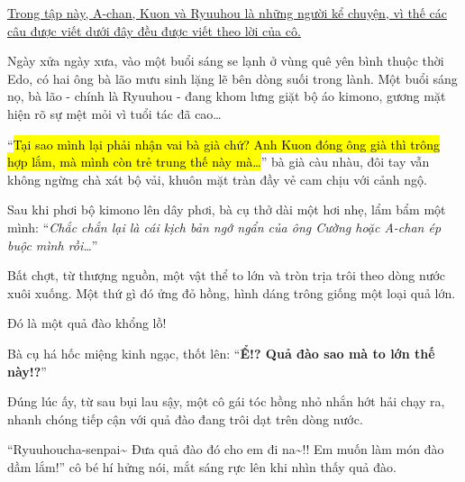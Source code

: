 \documentclass[../main.tex]{subfiles}
\begin{document}


\begin{center}
    \uline{Trong tập này, A-chan, Kuon và Ryuuhou là những người kể chuyện, vì thế các câu được viết dưới đây đều được viết theo lời của cô.}
\end{center}

Ngày xửa ngày xưa, vào một buổi sáng se lạnh ở vùng quê yên bình thuộc thời Edo, có hai ông bà lão mưu sinh lặng lẽ bên dòng suối trong lành. Một buổi sáng nọ, bà lão - chính là Ryuuhou - đang khom lưng giặt bộ áo kimono, gương mặt hiện rõ sự mệt mỏi vì tuổi tác đã cao\dots

``\hl{Tại sao mình lại phải nhận vai bà già chứ? Anh Kuon đóng ông già thì trông hợp lắm, mà mình còn trẻ trung thế này mà\dots}'' bà già càu nhàu, đôi tay vẫn không ngừng chà xát bộ vải, khuôn mặt tràn đầy vẻ cam chịu với cảnh ngộ.

Sau khi phơi bộ kimono lên dây phơi, bà cụ thở dài một hơi nhẹ, lẩm bẩm một mình: ``\textit{Chắc chắn lại là cái kịch bản ngớ ngẩn của ông Cường hoặc A-chan ép buộc mình rồi\dots}''

Bất chợt, từ thượng nguồn, một vật thể to lớn và tròn trịa trôi theo dòng nước xuôi xuống. Một thứ gì đó ửng đỏ hồng, hình dáng trông giống một loại quả lớn.

Đó là một quả đào khổng lồ!

Bà cụ há hốc miệng kinh ngạc, thốt lên: ``\textbf{Ể!? Quả đào sao mà to lớn thế này!?}''

Đúng lúc ấy, từ sau bụi lau sậy, một cô gái tóc hồng nhỏ nhắn hớt hải chạy ra, nhanh chóng tiếp cận với quả đào đang trôi dạt trên dòng nước.

``Ryuuhoucha-senpai\~{} Đưa quả đào đó cho em đi na\~{}!! Em muốn làm món đào dầm lắm!'' cô bé hí hửng nói, mắt sáng rực lên khi nhìn thấy quả đào.
\end{document}
